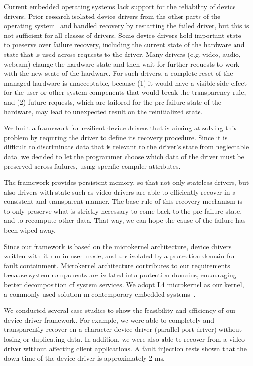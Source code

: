 \documentclass{acm_proc_article-sp}
\begin{document}
Current embedded operating systems lack support for the reliability of device drivers.  Prior research isolated device drivers from the other parts of the operating system~\cite{Herder2007,Swift2003} and handled recovery by restarting the failed driver, but this is not sufficient for all classes of drivers.  Some device drivers hold important state to preserve over failure recovery,  including the current state of the hardware and  state that is used across requests to the driver.  Many drivers (e.g. video, audio, webcam) change the hardware state and then wait for further requests to work with the new state of the hardware.  For such drivers, a complete reset of the managed hardware is unacceptable, because (1) it would have a visible side-effect for the user or other system components that would break the transparency rule, and (2) future requests, which are tailored for the pre-failure state of the hardware, may lead to unexpected result on the reinitialized state.

We built a framework for resilient device drivers that is aiming at solving this problem by requiring the driver to define its recovery procedure.  Since it is difficult to discriminate data that is relevant to the driver's state from neglectable data, we decided to let the programmer choose which data of the driver must be preserved across failures, using specific compiler attributes.

The framework provides persistent memory, so that not only stateless drivers, but also drivers with state such as video drivers are able to efficiently recover in a consistent and transparent manner.  The base rule of this recovery mechanism is to only preserve what is strictly necessary to come back to the pre-failure state, and to recompute other data. That way, we can hope the cause of the failure has been wiped away.

Since our framework is based on the microkernel architecture, device drivers written with it run in user mode, and are isolated by a protection domain for fault containment.  Microkernel architecture contributes to our requirements because system components are isolated into protection domains, encouraging better decomposition of system services.  We adopt L4 microkernel as our kernel, a commonly-used solution in contemporary embedded systems~\cite{Heiser2007}.

We conducted several case studies to show the feasibility and efficiency of our device driver framework. For example, we were able to completely and transparently recover on a character device driver (parallel port driver) without losing or duplicating data. In addition, we were also able to recover from a video driver without affecting client applications.  A fault injection tests shown that the down time of the device driver is approximately 2 ms.
\end{document}
